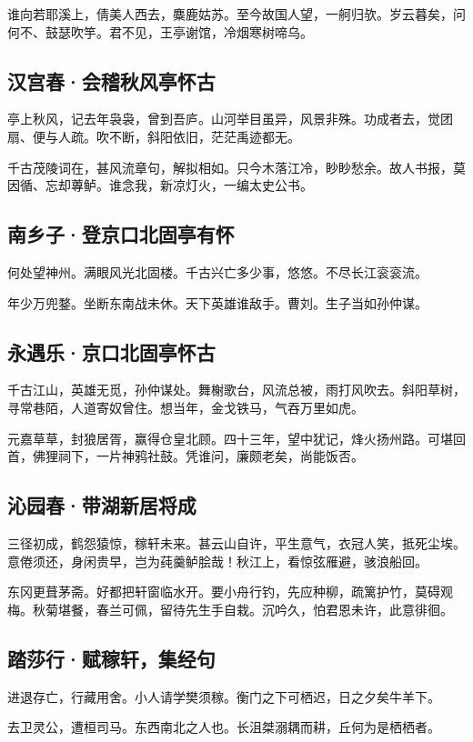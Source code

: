 \documentclass[a5paper]{ctexart}
\begin{document}
	谁向若耶溪上，倩美人西去，麋鹿姑苏。至今故国人望，一舸归欤。岁云暮矣，问何不、鼓瑟吹竽。君不见，王亭谢馆，冷烟寒树啼乌。
	
	\subsection{汉宫春·会稽秋风亭怀古}
	亭上秋风，记去年袅袅，曾到吾庐。山河举目虽异，风景非殊。功成者去，觉团扇、便与人疏。吹不断，斜阳依旧，茫茫禹迹都无。
	
	千古茂陵词在，甚风流章句，解拟相如。只今木落江冷，眇眇愁余。故人书报，莫因循、忘却蓴鲈。谁念我，新凉灯火，一编太史公书。
	
	\subsection{南乡子·登京口北固亭有怀}
	何处望神州。满眼风光北固楼。千古兴亡多少事，悠悠。不尽长江衮衮流。
	
	年少万兜鍪。坐断东南战未休。天下英雄谁敌手。曹刘。生子当如孙仲谋。
	
	\subsection{永遇乐·京口北固亭怀古}
	千古江山，英雄无觅，孙仲谋处。舞榭歌台，风流总被，雨打风吹去。斜阳草树，寻常巷陌，人道寄奴曾住。想当年，金戈铁马，气吞万里如虎。
	
	元嘉草草，封狼居胥，赢得仓皇北顾。四十三年，望中犹记，烽火扬州路。可堪回首，佛狸祠下，一片神鸦社鼓。凭谁问，廉颇老矣，尚能饭否。
	
	\subsection{沁园春·带湖新居将成}
	三径初成，鹤怨猿惊，稼轩未来。甚云山自许，平生意气，衣冠人笑，抵死尘埃。意倦须还，身闲贵早，岂为莼羹鲈脍哉！秋江上，看惊弦雁避，骇浪船回。
	
	东冈更葺茅斋。好都把轩窗临水开。要小舟行钓，先应种柳，疏篱护竹，莫碍观梅。秋菊堪餐，春兰可佩，留待先生手自栽。沉吟久，怕君恩未许，此意徘徊。
	
	\subsection{踏莎行·赋稼轩，集经句}
	进退存亡，行藏用舍。小人请学樊须稼。衡门之下可栖迟，日之夕矣牛羊下。
	
	去卫灵公，遭桓司马。东西南北之人也。长沮桀溺耦而耕，丘何为是栖栖者。
	
\end{document}
